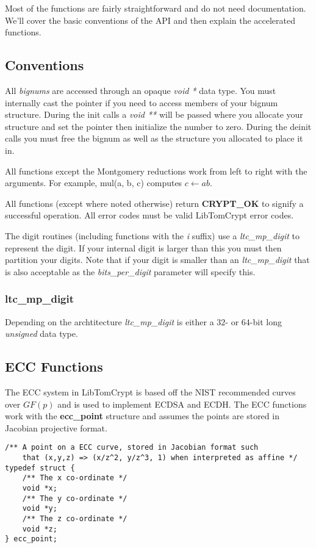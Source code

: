 \documentclass[synpaper]{book}
\begin{document}
Most of the functions are fairly straightforward and do not need documentation.  We'll cover the basic conventions of the API and then explain the accelerated functions.

\subsection{Conventions}

All \textit{bignums} are accessed through an opaque \textit{void *} data type.  You must internally cast the pointer if you need to access members of your bignum structure.  During
the init calls a \textit{void **} will be passed where you allocate your structure and set the pointer then initialize the number to zero.  During the deinit calls you must
free the bignum as well as the structure you allocated to place it in.

All functions except the Montgomery reductions work from left to right with the arguments.  For example, mul(a, b, c) computes $c \leftarrow ab$.

All functions (except where noted otherwise) return \textbf{CRYPT\_OK} to signify a successful operation.  All error codes must be valid LibTomCrypt error codes.

The digit routines (including functions with the \textit{i} suffix) use a \textit{ltc\_mp\_digit} to represent the digit.  If your internal digit is larger than this you must
then partition your digits.  Note that if your digit is smaller than an \textit{ltc\_mp\_digit} that is also acceptable as the \textit{bits\_per\_digit} parameter will specify this.

\subsubsection{ltc\_mp\_digit}

Depending on the archtitecture \textit{ltc\_mp\_digit} is either a $32$- or $64$-bit long \textit{unsigned} data type.

\subsection{ECC Functions}
The ECC system in LibTomCrypt is based off the NIST recommended curves over $GF(p)$ and is used to implement ECDSA and ECDH.   The ECC functions work with
the \textbf{ecc\_point} structure and assumes the points are stored in Jacobian projective format.

\begin{verbatim}
/** A point on a ECC curve, stored in Jacobian format such
    that (x,y,z) => (x/z^2, y/z^3, 1) when interpreted as affine */
typedef struct {
    /** The x co-ordinate */
    void *x;
    /** The y co-ordinate */
    void *y;
    /** The z co-ordinate */
    void *z;
} ecc_point;
\end{verbatim}
\end{document}
